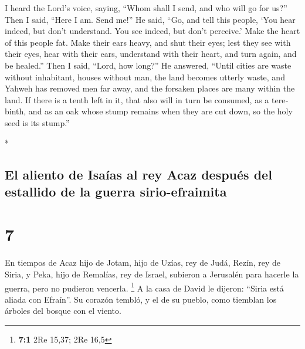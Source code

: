 \begin{paracol}{2}
\begin{otherlanguage}{english}
 I heard the Lord's voice, saying, ``Whom shall I send,
and who will go for us?'' Then I said, ``Here I am. Send me!''
 He said, ``Go, and tell this people, `You hear indeed,
but don't understand. You see indeed, but don't perceive.'
 Make the heart of this people fat. Make their ears
heavy, and shut their eyes; lest they see with their eyes, hear with
their ears, understand with their heart, and turn again, and be
healed.''  Then I said, ``Lord, how long?'' He answered,
``Until cities are waste without inhabitant, houses without man, the
land becomes utterly waste,  and Yahweh has removed men
far away, and the forsaken places are many within the land.
 If there is a tenth left in it, that also will in turn
be consumed, as a terebinth, and as an oak whose stump remains when they
are cut down, so the holy seed is its stump.''

\end{otherlanguage}

\switchcolumn[0]*

\hypertarget{el-aliento-de-isauxedas-al-rey-acaz-despuuxe9s-del-estallido-de-la-guerra-sirio-efraimita}{%
\subsection{El aliento de Isaías al rey Acaz después del estallido de la
guerra
sirio-efraimita}\label{el-aliento-de-isauxedas-al-rey-acaz-despuuxe9s-del-estallido-de-la-guerra-sirio-efraimita}}

\hypertarget{section-12}{%
\section{7}\label{section-12}}

 En tiempos de Acaz hijo de Jotam, hijo de Uzías, rey de
Judá, Rezín, rey de Siria, y Peka, hijo de Remalías, rey de Israel,
subieron a Jerusalén para hacerle la guerra, pero no pudieron vencerla.
\footnote{\textbf{7:1} 2Re 15,37; 2Re 16,5}  A la casa de
David le dijeron: ``Siria está aliada con Efraín''. Su corazón tembló, y
el de su pueblo, como tiemblan los árboles del bosque con el viento.


\end{paracol}
